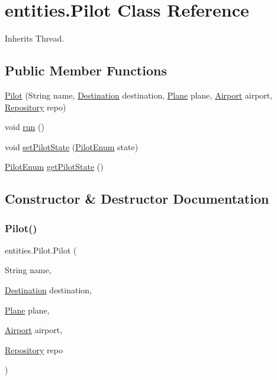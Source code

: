 \hypertarget{classentities_1_1_pilot}{}\section{entities.\+Pilot Class Reference}
\label{classentities_1_1_pilot}


Inherits Thread.

\subsection*{Public Member Functions}
\begin{DoxyCompactItemize}
\item 
\hyperlink{classentities_1_1_pilot_a9d5d09281d60d0c8f36662320f1cfa49}{Pilot} (String name, \hyperlink{classshared_regions_1_1_destination}{Destination} destination, \hyperlink{classshared_regions_1_1_plane}{Plane} plane, \hyperlink{classshared_regions_1_1_airport}{Airport} airport, \hyperlink{classshared_regions_1_1_repository}{Repository} repo)
\item 
void \hyperlink{classentities_1_1_pilot_aa0a1f2dd8931f01b03cdc2aa9e99acaf}{run} ()
\item 
void \hyperlink{classentities_1_1_pilot_a1eb8f6f3fd60fbf50829491b6e263ab9}{set\+Pilot\+State} (\hyperlink{enumentities_1_1_pilot_enum}{Pilot\+Enum} state)
\item 
\hyperlink{enumentities_1_1_pilot_enum}{Pilot\+Enum} \hyperlink{classentities_1_1_pilot_ac16922ae9aa6296ff7adfb1dcfa50d3a}{get\+Pilot\+State} ()
\end{DoxyCompactItemize}


\subsection{Constructor \& Destructor Documentation}
\mbox{\label{classentities_1_1_pilot_a9d5d09281d60d0c8f36662320f1cfa49}} 
\subsubsection{\texorpdfstring{Pilot()}{Pilot()}}
{\footnotesize\ttfamily entities.\+Pilot.\+Pilot (\begin{DoxyParamCaption}\item[{String}]{name,  }\item[{\hyperlink{classshared_regions_1_1_destination}{Destination}}]{destination,  }\item[{\hyperlink{classshared_regions_1_1_plane}{Plane}}]{plane,  }\item[{\hyperlink{classshared_regions_1_1_airport}{Airport}}]{airport,  }\item[{\hyperlink{classshared_regions_1_1_repository}{Repository}}]{repo }\end{DoxyParamCaption})}



